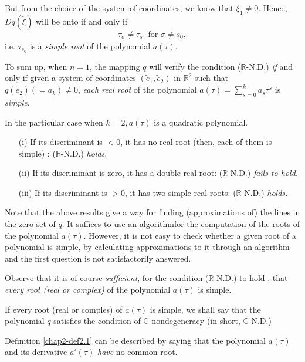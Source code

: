 But from the choice of the system of coordinates, we know that $\xi_{1} \neq 0$. Hence, $Dq(\widetilde{\xi})$ will be onto if and only if
$$
\tau_{\sigma} \neq \tau_{s_{0}} \text{ for } \sigma \neq s_{0},
$$
i.e. $\tau_{s_{0}}$ is a {\em simple root} of the polynomial $a(\tau)$.

To sum up, when $n = 1$, the mapping $q$ will verify the condition ($\mathbb{R}$-N.D.) {\em if} and only if given a system of coordinates $(\widetilde{e}_{1}, \widetilde{e}_{2})$ in $\mathbb{R}^{2}$ such that $q(\widetilde{e}_{2}) (= a_{k}) \neq 0$, {\em each real root} of the polynomial $a(\tau) = \sum\limits_{s=0}^{k} a_{s} \tau^{s}$ is {\em simple}.

In the particular case when $k = 2, a(\tau)$ is a quadratic polynomial.
\begin{enumerate}
\item[(i)] If its discriminant is $< 0$, it has no real root (then, each of them is simple) : ($\mathbb{R}$-N.D.) {\em holds}.

\item[(ii)] If its discriminant is zero, it has a double real root: ($\mathbb{R}$-N.D.) {\em fails to hold.}

\item[(iii)] If its discriminant is $> 0$, it has two simple real roots: ($\mathbb{R}$-N.D.) {\em holds.}
\end{enumerate}

Note that the above results give a way for finding (approximations of) the lines in the zero set of $q$. It suffices to use an algorithm\pageoriginale for the computation of the roots of the polynomial $a(\tau)$. However, it is not easy to check whether a given root of a polynomial is simple, by calculating approximations to it through an algorithm and the first question is not satisfactorily answered.

Observe that it is of course {\em sufficient}, for the condition ($\mathbb{R}$-N.D.) to hold , that {\em every root (real or complex)} of the polynomial $a(\tau)$ is simple.

\begin{definition}\label{chap2-def2.1}
If every root (real or comples) of $a(\tau)$ is simple, we shall say that the polynomial $q$ satisfies the condition of $\mathbb{C}$-nondegeneracy (in short, $\mathbb{C}$-N.D.)
\end{definition}

Definition \ref{chap2-def2.1} can be described by saying that the polynomial $a(\tau)$ and its derivative $a'(\tau)$ {\em have} no common root.

